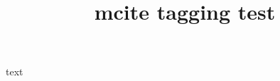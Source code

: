\documentclass{article}
\title{mcite tagging test}
\begin{document}
text \cite{article-full,*incollection-minimal}

\cite{inbook-minimal}



\end{document}
